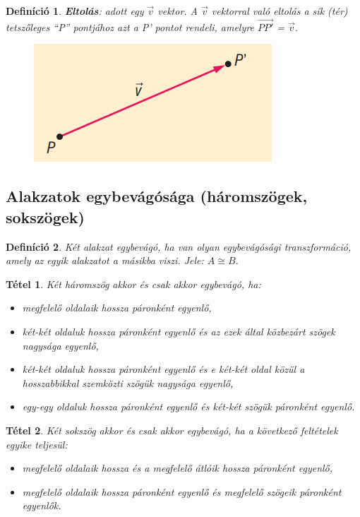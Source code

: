 \documentclass[12pt,a4paper]{article}
\newtheorem{theorem}{Tétel} [section]
\newtheorem{definition}{Definíció} [section]
\begin{document}
\begin{definition}
\textbf{Eltolás}: adott egy $\vec{v}$ vektor. A $\vec{v}$ vektorral való eltolás a sík (tér) tetszőleges ``P'' pontjához azt a P' pontot rendeli, amelyre $\overrightarrow{PP'}$ = $\vec{v}$.
\begin{figure}[h!]
\centering
\includegraphics[scale=0.3]{geometry/eltolas}
\end{figure}
\end{definition}

\subsection{Alakzatok egybevágósága (háromszögek, sokszögek)}

\begin{definition}
Két alakzat egybevágó, ha van olyan egybevágósági transzformáció, amely az egyik alakzatot a másikba viszi. Jele: $A \cong B$.
\end{definition}

\begin{theorem}
Két háromszög akkor és csak akkor egybevágó, ha:
\begin{itemize}
\item megfelelő oldalaik hossza páronként egyenlő,
\item két-két oldaluk hossza páronként egyenlő és az ezek által közbezárt szögek nagysága egyenlő,
\item két-két oldaluk hossza páronként egyenlő és e két-két oldal közül a hosszabbikkal szemközti szögük nagysága egyenlő,
\item egy-egy oldaluk hossza páronként egyenlő és két-két szögük páronként egyenlő.
\end{itemize}
\end{theorem}

\begin{theorem}
Két sokszög akkor és csak akkor egybevágó, ha a következő feltételek egyike teljesül:
\begin{itemize}
\item megfelelő oldalaik hossza és a megfelelő átlóik hossza páronként egyenlő,
\item megfelelő oldalaik hossza páronként egyenlő és megfelelő szögeik páronként egyenlők.
\end{itemize}
\end{theorem}
\end{document}
